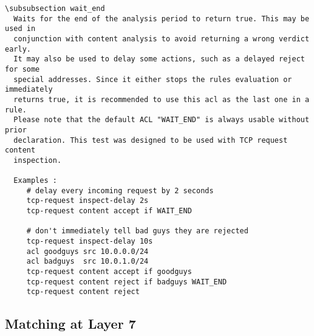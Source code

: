\begin{verbatim}
\subsubsection wait_end
  Waits for the end of the analysis period to return true. This may be used in
  conjunction with content analysis to avoid returning a wrong verdict early.
  It may also be used to delay some actions, such as a delayed reject for some
  special addresses. Since it either stops the rules evaluation or immediately
  returns true, it is recommended to use this acl as the last one in a rule.
  Please note that the default ACL "WAIT_END" is always usable without prior
  declaration. This test was designed to be used with TCP request content
  inspection.

  Examples :
     # delay every incoming request by 2 seconds
     tcp-request inspect-delay 2s
     tcp-request content accept if WAIT_END

     # don't immediately tell bad guys they are rejected
     tcp-request inspect-delay 10s
     acl goodguys src 10.0.0.0/24
     acl badguys  src 10.0.1.0/24
     tcp-request content accept if goodguys
     tcp-request content reject if badguys WAIT_END
     tcp-request content reject
\end{verbatim}

\subsection{Matching at Layer 7}

